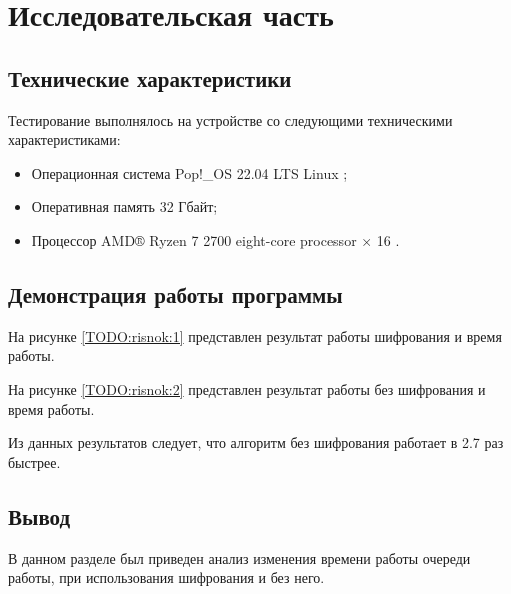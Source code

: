 \section{\large Исследовательская часть}

\subsection{Технические характеристики}

Тестирование выполнялось на устройстве со следующими техническими характеристиками:

\begin{itemize}
	\item Операционная система Pop!\_OS 22.04 LTS \cite{ubuntu} Linux \cite{linux};
	\item Оперативная память 32 Гбайт;
	\item Процессор AMD® Ryzen 7 2700 eight-core processor × 16 \cite{amd}.
\end{itemize}

\subsection{Демонстрация работы программы}

На рисунке \ref{TODO:risnok:1} представлен результат работы шифрования и время работы.

\begin{figure}[ht!]
\end{figure}

На рисунке \ref{TODO:risnok:2} представлен результат работы без шифрования и время работы.


\begin{figure}[ht!]
\end{figure}


Из данных результатов следует, что алгоритм без шифрования работает в 2.7 раз быстрее.

\subsection*{Вывод}

В данном разделе был приведен анализ изменения времени работы очереди работы, 
при использования шифрования и без него.